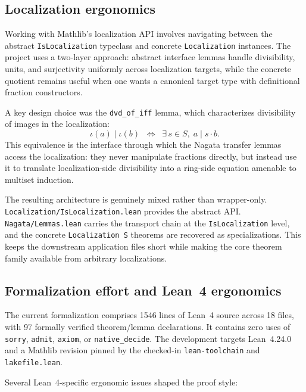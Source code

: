 \documentclass[11pt]{article}
\theoremstyle{plain}
\theoremstyle{definition}
\theoremstyle{remark}
\newcommand{\li}[1]{\texorpdfstring{\texttt{#1}}{#1}}
\newcommand{\lf}[1]{\texorpdfstring{\nolinkurl{#1}}{#1}}
\begin{document}
\subsection{Localization ergonomics}

Working with Mathlib's localization API involves navigating between the abstract
\li{IsLocalization} typeclass and concrete \li{Localization} instances.  The
project uses a two-layer approach: abstract interface lemmas handle
divisibility, units, and surjectivity uniformly across localization targets,
while the concrete quotient remains useful when one wants a canonical target
type with definitional fraction constructors.

A key design choice was the \li{dvd\_of\_iff} lemma, which characterizes
divisibility of images in the localization:
\[
  \iota(a)\mid\iota(b)
  \;\;\Longleftrightarrow\;\;
  \exists\,s\in S,\;a\mid s\cdot b.
\]
This equivalence is the interface through which the Nagata transfer lemmas
access the localization: they never manipulate fractions directly, but instead
use it to translate localization-side divisibility into a ring-side equation
amenable to multiset induction.

The resulting architecture is genuinely mixed rather than wrapper-only.
\lf{Localization/IsLocalization.lean} provides the abstract API.
\lf{Nagata/Lemmas.lean} carries the transport chain at the
\li{IsLocalization} level, and the concrete \li{Localization\,S} theorems are
recovered as specializations.  This keeps the downstream application files
short while making the core theorem family available from arbitrary
localizations.

\subsection{Formalization effort and Lean~4 ergonomics}

The current formalization comprises 1546 lines of Lean~4 source across 18
files, with 97 formally verified theorem/lemma declarations.  It contains zero
uses of \li{sorry}, \li{admit}, \li{axiom}, or \li{native\_decide}.  The
development targets Lean~4.24.0 and a Mathlib revision pinned by the checked-in
\lf{lean-toolchain} and \lf{lakefile.lean}.

Several Lean~4-specific ergonomic issues shaped the proof style:
\end{document}
